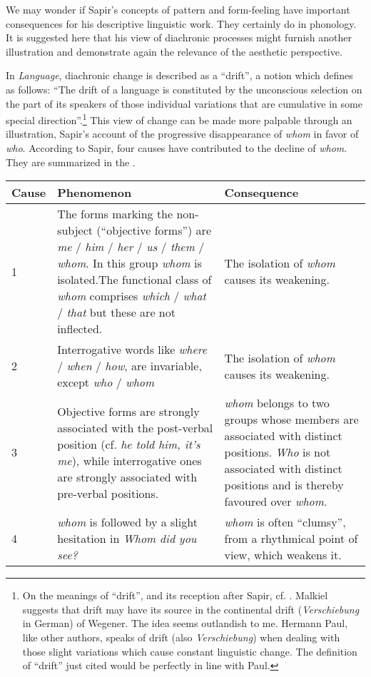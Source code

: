 \documentclass[output=paper]{langscibook}
\begin{document}
We may wonder if Sapir's concepts of pattern and form-feeling have important consequences for his descriptive linguistic work. They certainly do in phonology. It is suggested here that his view of diachronic processes might furnish another illustration and demonstrate again the relevance of the aesthetic perspective.

In \emph{Language}, diachronic change is described as a ``drift'', a notion which \citep[155]{Sapir1921} defines as follows: ``The drift of a language is constituted by the unconscious selection on the part of its speakers of those individual variations that are cumulative in some special direction''.\footnote{On the meanings of ``drift'', and its reception after Sapir, cf. \citet{Malkiel1981}. Malkiel suggests that drift may have its source in the continental drift (\emph{Verschiebung} in German) of Wegener. The idea seems outlandish to me. Hermann Paul, like other authors, speaks of drift (also \emph{Verschiebung}) when dealing with those slight variations which cause constant linguistic change. The definition of ``drift'' just cited would be perfectly in line with Paul.} This view of change can be made more palpable through an illustration, Sapir's account of the progressive disappearance of \emph{whom} in favor of \emph{who}. According to Sapir, four causes have contributed to the decline of \emph{whom}. They are summarized in the .

\begin{table}
\label{tab:fortis:causes}
\begin{tabular}{p{2cm} p{4.25cm} p{4.25cm}}
\textbf{Cause} & \textbf{Phenomenon} & \textbf{Consequence} \\
\midrule
1 & The forms marking the non-subject (``objective forms'') are \emph{me} / \emph{him} / \emph{her} / \emph{us} / \emph{them} / \emph{whom}. In this group \emph{whom} is isolated.\newline The functional class of \emph{whom} comprises \emph{which} / \emph{what} / \emph{that} but these are not inflected.
& The isolation of \emph{whom} causes its weakening. \\
\midrule
2 & Interrogative words like \emph{where} / \emph{when} / \emph{how}, are invariable, except \emph{who} / \emph{whom} & The isolation of \emph{whom} causes its weakening. \\
\midrule
3 & Objective forms are strongly associated with the post-verbal position (cf. \emph{he told him, it's me}), while interrogative ones are strongly associated with pre-verbal positions. & \emph{whom} belongs to two groups whose members are associated with distinct positions. \emph{Who} is not associated with distinct positions and is thereby favoured over \emph{whom}. \\
\midrule
4 & \emph{whom} is followed by a slight hesitation in \emph{Whom did you see?} & \emph{whom} is often ``clumsy'', from a rhythmical point of view, which weakens it.
\end{tabular}
\end{table}
\end{document}
